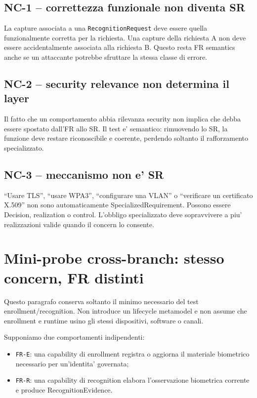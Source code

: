 \documentclass[11pt,a4paper]{article}
\begin{document}
\subsection{NC-1 -- correttezza funzionale non diventa SR}

La capture associata a una \texttt{RecognitionRequest} deve essere quella funzionalmente corretta per la richiesta. Una capture della richiesta A non deve essere accidentalmente associata alla richiesta B. Questo resta FR semantics anche se un attaccante potrebbe sfruttare la stessa classe di errore.

\subsection{NC-2 -- security relevance non determina il layer}

Il fatto che un comportamento abbia rilevanza security non implica che debba essere spostato dall'FR allo SR. Il test e' semantico: rimuovendo lo SR, la funzione deve restare riconoscibile e coerente, perdendo soltanto il rafforzamento specializzato.

\subsection{NC-3 -- meccanismo non e' SR}

``Usare TLS'', ``usare WPA3'', ``configurare una VLAN'' o ``verificare un certificato X.509'' non sono automaticamente SpecializedRequirement. Possono essere Decision, realization o control. L'obbligo specializzato deve sopravvivere a piu' realizzazioni valide quando il concern lo consente.

\section{Mini-probe cross-branch: stesso concern, FR distinti}

Questo paragrafo conserva soltanto il minimo necessario del test enrollment/recognition. Non introduce un lifecycle metamodel e non assume che enrollment e runtime usino gli stessi dispositivi, software o canali.

Supponiamo due comportamenti indipendenti:

\begin{itemize}
  \item \texttt{FR-E}: una capability di enrollment registra o aggiorna il materiale biometrico necessario per un'identita' governata;
  \item \texttt{FR-R}: una capability di recognition elabora l'osservazione biometrica corrente e produce RecognitionEvidence.
\end{itemize}
\end{document}
